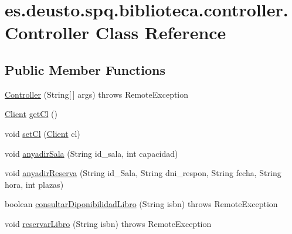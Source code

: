 \hypertarget{classes_1_1deusto_1_1spq_1_1biblioteca_1_1controller_1_1_controller}{}\section{es.\+deusto.\+spq.\+biblioteca.\+controller.\+Controller Class Reference}
\label{classes_1_1deusto_1_1spq_1_1biblioteca_1_1controller_1_1_controller}
\subsection*{Public Member Functions}
\begin{DoxyCompactItemize}
\item 
\mbox{\hyperlink{classes_1_1deusto_1_1spq_1_1biblioteca_1_1controller_1_1_controller_a130eebcaf76a2f9ed7d3d032ab232746}{Controller}} (String\mbox{[}$\,$\mbox{]} args)  throws Remote\+Exception 
\item 
\mbox{\hyperlink{classes_1_1deusto_1_1spq_1_1biblioteca_1_1client_1_1_client}{Client}} \mbox{\hyperlink{classes_1_1deusto_1_1spq_1_1biblioteca_1_1controller_1_1_controller_a14860df4246cd7cefcc7e9e460d504ce}{get\+Cl}} ()
\item 
void \mbox{\hyperlink{classes_1_1deusto_1_1spq_1_1biblioteca_1_1controller_1_1_controller_afe5f91697abeb5864f3f21faa89c3f01}{set\+Cl}} (\mbox{\hyperlink{classes_1_1deusto_1_1spq_1_1biblioteca_1_1client_1_1_client}{Client}} cl)
\item 
void \mbox{\hyperlink{classes_1_1deusto_1_1spq_1_1biblioteca_1_1controller_1_1_controller_aa000adfc328c903b4915e2e20c94e22d}{anyadir\+Sala}} (String id\+\_\+sala, int capacidad)
\item 
void \mbox{\hyperlink{classes_1_1deusto_1_1spq_1_1biblioteca_1_1controller_1_1_controller_ac3d198e961cb93301dce00484cf462a8}{anyadir\+Reserva}} (String id\+\_\+\+Sala, String dni\+\_\+respon, String fecha, String hora, int plazas)
\item 
boolean \mbox{\hyperlink{classes_1_1deusto_1_1spq_1_1biblioteca_1_1controller_1_1_controller_a56b80d08fca56676988e71f3abac0372}{consultar\+Diponibilidad\+Libro}} (String isbn)  throws Remote\+Exception 
\item 
void \mbox{\hyperlink{classes_1_1deusto_1_1spq_1_1biblioteca_1_1controller_1_1_controller_a3c1193157badc8d2dad7125e8e0658f6}{reservar\+Libro}} (String isbn)  throws Remote\+Exception 
\item 

\end{DoxyCompactItemize}
